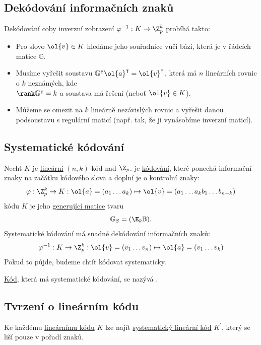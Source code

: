 \subsection{Dekódování informačních znaků}
Dekódování coby inverzní zobrazení $\varphi^{-1} : K \to \Z_p^k$ probíhá takto:
\vspace{-1em}
\begin{itemize}
	\item Pro slovo $\ol{v} \in K$ hledáme jeho souřadnice vůči bázi, která je v řádcích matice $\mathbb{G}$.
	\item Musíme vyřešit soustavu $\mathbb{G}^\intercal \ol{a}^\intercal = \ol{v}^\intercal$, která má $n$ lineárních rovnic o $k$ neznámých, kde \\ $\rank \mathbb{G}^\intercal = k$ a soustava má řešení (neboť $\ol{v} \in K$).
	\item Můžeme se omezit na $k$ lineárně nezávislých rovnic a vyřešit danou podsoustavu s regulární maticí (např. tak, že ji vynásobíme inverzní maticí). 
\end{itemize}

\subsection{Systematické kódování}\label{systKod}
Nechť $K$ je \hyperref[linKod]{lineární} $(n,k)$-kód nad $\Z_p$.  je \hyperref[kodovani]{kódování}, které ponechá informační znaky na začátku kódového slova a doplní je o kontrolní znaky:
\begin{equation}
	\varphi : \Z_p^k \to K : \ol{a} = (a_1 \dots a_k) \mapsto \ol{v} = (a_1 \dots a_k b_1 \dots b_{n-k})
\end{equation}
 kódu $K$ je jeho \hyperref[genMat]{generující matice} tvaru
\begin{equation}
	\mathbb{G}_S = (\E_k \mathbb{B}).
\end{equation}
Systematické kódování má snadné dekódování informačních znaků:
\begin{equation}
	\varphi^{-1}: K \to \Z_p^k: \ol{v} = (v_1 \dots v_n) \mapsto \ol{a} = (v_1 \dots v_k)
\end{equation}
Pokud to půjde, budeme chtít kódovat systematicky.

\hyperref[kod]{Kód}, která má systematické kódování, se nazývá .

\subsection{Tvrzení o lineárním kódu}
Ke každému \hyperref[linKod]{lineárnímu kódu} $K$ lze najít \hyperref[systKod]{systematický lineární kód} $K^\prime$, který se liší pouze v pořadí znaků.

